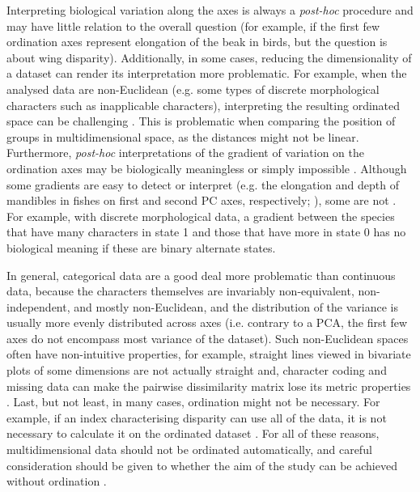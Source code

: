 \documentclass[12pt,letterpaper]{article}
\begin{document}
Interpreting biological variation along the axes is always a \textit{post-hoc} procedure and may have little relation to the overall question (for example, if the first few ordination axes represent elongation of the beak in birds, but the question is about wing disparity).
Additionally, in some cases, reducing the dimensionality of a dataset can render its interpretation more problematic.
For example, when the analysed data are non-Euclidean (e.g. some types of discrete morphological characters such as inapplicable characters), interpreting the resulting ordinated space can be challenging \citep{Gerber2019}.
This is problematic when comparing the position of groups in multidimensional space, as the distances might not be linear.
Furthermore, \textit{post-hoc} interpretations of the gradient of variation on the ordination axes may be biologically meaningless or simply impossible \citep{Gerber2019}.
Although some gradients are easy to detect or interpret (e.g.
the elongation and depth of mandibles in fishes on first and second PC axes, respectively; \citealt{Hill2018}), some are not \citep[e.g.][]{Weisbecker2019}.
For example, with discrete morphological data, a gradient between the species that have many characters in state 1 and those that have more in state 0 has no biological meaning if these are binary alternate states.

In general, categorical data are a good deal more problematic than continuous data, because the characters themselves are invariably non-equivalent, non-independent, and mostly non-Euclidean, and the distribution of the variance is usually more evenly distributed across axes (i.e. contrary to a PCA, the first few axes do not encompass most variance of the dataset).
Such non-Euclidean spaces often have non-intuitive properties, for example, straight lines viewed in bivariate plots of some dimensions are not actually straight and, character coding and missing data can make the pairwise dissimilarity matrix lose its metric properties \citep[i.e. the distance between A and B is not equal to the distance between B and A;][]{Gerber2014}.
Last, but not least, in many cases, ordination might not be necessary.
For example, if an index characterising disparity can use all of the data, it is not necessary to calculate it on the ordinated dataset \citep[e.g.][]{Close2015}.
For all of these reasons, multidimensional data should not be ordinated automatically, and careful consideration should be given to whether the aim of the study can be achieved without ordination \citep{lloyd2016,lloyd2018}.
\end{document}

